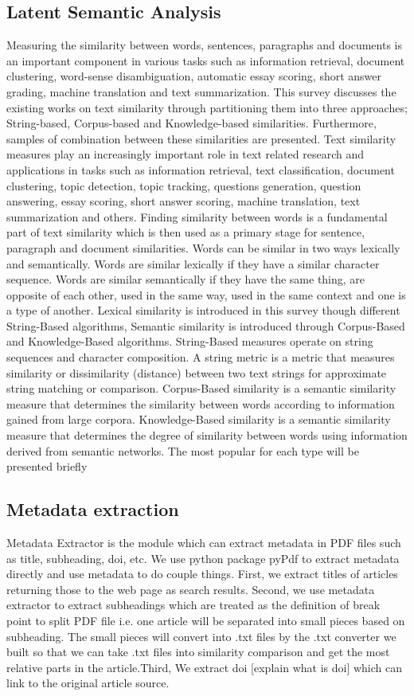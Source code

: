 \documentclass[a4paper,twocolumn,twoside]{article}
\begin{document}
	\subsection{Latent Semantic Analysis}
Measuring the similarity between words, sentences, paragraphs and documents is an important component in various tasks such as information retrieval, document clustering, word-sense disambiguation, automatic essay scoring, short answer grading, machine translation and text summarization. 
This survey discusses the existing works on text similarity through partitioning them into three approaches; String-based, Corpus-based and Knowledge-based similarities. 
Furthermore, samples of combination between these similarities are presented.
Text similarity measures play an increasingly important role in text related research and applications in tasks such as information retrieval, text classification, document clustering, topic detection, topic tracking, questions generation, question answering, essay scoring, short answer scoring, machine translation, text summarization and others. 
Finding similarity between words is a fundamental part of text similarity which is then used as a primary stage for sentence, paragraph and document similarities. 
Words can be similar in two ways lexically and semantically. Words are similar lexically if they have a similar character sequence. Words are similar semantically if they have the same thing, are opposite of each other, used in the same way, used in the same context and one is a type of another. 
Lexical similarity is introduced in this survey though different String-Based algorithms, Semantic similarity is introduced through Corpus-Based and Knowledge-Based algorithms. 
String-Based measures operate on string sequences and character composition. A string metric is a metric that measures similarity or dissimilarity (distance) between two text strings for approximate string matching or comparison. 
Corpus-Based similarity is a semantic similarity measure that determines the similarity between words according to information gained from large corpora. 
Knowledge-Based similarity is a semantic similarity measure that determines the degree of similarity between words using information derived from semantic networks. The most popular for each type will be presented briefly
	
	\subsection{Metadata extraction}
    Metadata Extractor is the module which can extract metadata in PDF files such as title, subheading, doi, etc. We use python package pyPdf to extract metadata directly and use metadata to do couple things. First, we extract titles of articles returning those to the web page as search results. Second, we use metadata extractor to extract subheadings which are treated as the definition of break point to split PDF file i.e. one article will be separated into small pieces based on subheading. The small pieces will convert into .txt files by the .txt converter we built so that we can take .txt files into similarity comparison and get the most relative parts in the article.Third, We extract doi [explain what is doi] which can link to the original article source. 
	
\end{document}
